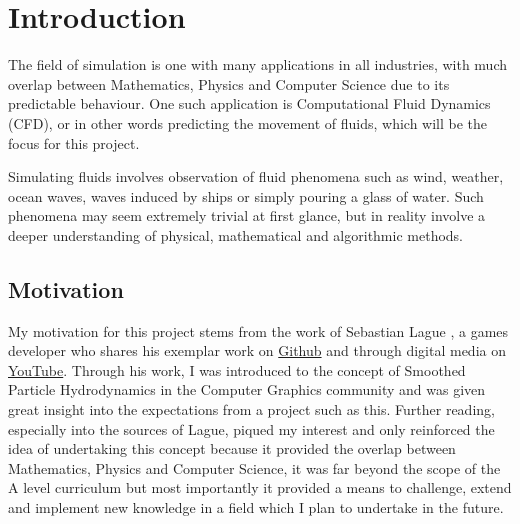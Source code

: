 \documentclass[write-up.tex]{subfiles}
\begin{document}
\section{Introduction}
The field of simulation is one with many applications in all industries, with much overlap between Mathematics, Physics and Computer Science due to its predictable behaviour. One such application is Computational Fluid Dynamics (CFD), or in other words predicting the movement of fluids, which will be the focus for this project.

Simulating fluids involves observation of fluid phenomena such as wind, weather, ocean waves, waves induced by ships or simply pouring a glass of water. Such phenomena may seem extremely trivial at first glance, but in reality involve a deeper understanding of physical, mathematical and algorithmic methods.


\subsection{Motivation}

My motivation for this project stems from the work of Sebastian Lague \cite{Lague}, a games developer who shares his exemplar work on \href{https://github.com/}{Github} and through digital media on \href{https://youtube.com}{YouTube}. Through his work, I was introduced to the concept of Smoothed Particle Hydrodynamics in the Computer Graphics community and was given great insight into the expectations from a project such as this. Further reading, especially into the sources of Lague, piqued my interest and only reinforced the idea of undertaking this concept because it provided the overlap between Mathematics, Physics and Computer Science, it was far beyond the scope of the A level curriculum but most importantly it provided a means to challenge, extend and implement new knowledge in a field which I plan to undertake in the future.
\end{document}
